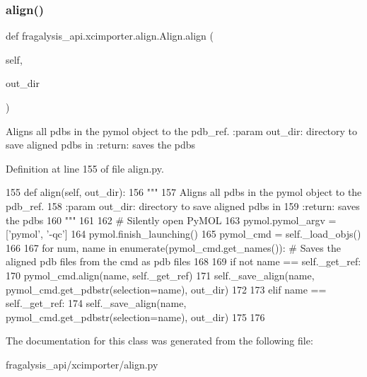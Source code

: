 \subsubsection{\texorpdfstring{align()}{align()}}
{\footnotesize\ttfamily def fragalysis\+\_\+api.\+xcimporter.\+align.\+Align.\+align (\begin{DoxyParamCaption}\item[{}]{self,  }\item[{}]{out\+\_\+dir }\end{DoxyParamCaption})}

\begin{DoxyVerb}Aligns all pdbs in the pymol object to the pdb_ref.
:param out_dir: directory to save aligned pdbs in
:return: saves the pdbs
\end{DoxyVerb}
 

Definition at line 155 of file align.\+py.


\begin{DoxyCode}
155     \textcolor{keyword}{def }align(self, out\_dir):
156         \textcolor{stringliteral}{"""}
157 \textcolor{stringliteral}{        Aligns all pdbs in the pymol object to the pdb\_ref.}
158 \textcolor{stringliteral}{        :param out\_dir: directory to save aligned pdbs in}
159 \textcolor{stringliteral}{        :return: saves the pdbs}
160 \textcolor{stringliteral}{        """}
161 
162         \textcolor{comment}{# Silently open PyMOL}
163         pymol.pymol\_argv = [\textcolor{stringliteral}{'pymol'}, \textcolor{stringliteral}{'-qc'}]
164         pymol.finish\_launching()
165         pymol\_cmd = self.\_load\_objs()
166 
167         \textcolor{keywordflow}{for} num, name \textcolor{keywordflow}{in} enumerate(pymol\_cmd.get\_names()):  \textcolor{comment}{# Saves the aligned pdb files from the cmd as
       pdb files}
168 
169             \textcolor{keywordflow}{if} \textcolor{keywordflow}{not} name == self.\_get\_ref:
170                 pymol\_cmd.align(name, self.\_get\_ref)
171                 self.\_save\_align(name, pymol\_cmd.get\_pdbstr(selection=name), out\_dir)
172 
173             \textcolor{keywordflow}{elif} name == self.\_get\_ref:
174                 self.\_save\_align(name, pymol\_cmd.get\_pdbstr(selection=name), out\_dir)
175 
176 
\end{DoxyCode}


The documentation for this class was generated from the following file\+:\begin{DoxyCompactItemize}
\item 
fragalysis\+\_\+api/xcimporter/align.\+py\end{DoxyCompactItemize}
